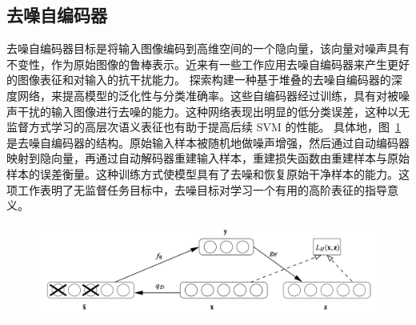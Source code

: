 \subsection{去噪自编码器} \label{sec:rel_dae}
去噪自编码器目标是将输入图像编码到高维空间的一个隐向量，该向量对噪声具有不变性，作为原始图像的鲁棒表示。近来有一些工作应用去噪自编码器来产生更好的图像表征和对输入的抗干扰能力。
\citet{vincent2010stacked} 探索构建一种基于堆叠的去噪自编码器的深度网络，来提高模型的泛化性与分类准确率。这些自编码器经过训练，具有对被噪声干扰的输入图像进行去噪的能力。这种网络表现出明显的低分类误差，这种以无监督方式学习的高层次语义表征也有助于提高后续 SVM 的性能。
具体地，图~\ref{c2_fig10}是去噪自编码器的结构。原始输入样本被随机地做噪声增强，然后通过自动编码器映射到隐向量，再通过自动解码器重建输入样本，重建损失函数由重建样本与原始样本的误差衡量。这种训练方式使模型具有了去噪和恢复原始干净样本的能力。这项工作表明了无监督任务目标中，去噪目标对学习一个有用的高阶表征的指导意义。
    \begin{figure}[tbp]
        \centering 
        \includegraphics[width=1.0\textwidth]{img/c2/rel_b4.png}
        \label{c2_fig10}
    \end{figure}

